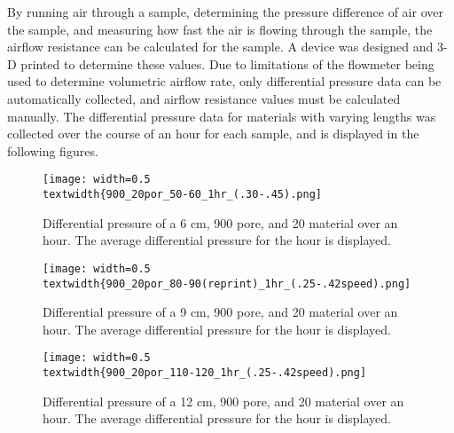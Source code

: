	By running air through a sample, determining the pressure difference of air over the 
sample, and measuring how fast the air is flowing through the sample, the airflow resistance 
can be calculated for the sample. A device was designed and 3-D printed to determine these 
values. Due to limitations of the flowmeter being used to determine volumetric airflow rate, 
only differential pressure data can be automatically collected, and airflow resistance values 
must be calculated manually. The differential pressure data for materials with varying 
lengths was collected over the course of an hour for each sample, and is displayed in the 
following figures.
\begin{figure}[h!]
  \begin{center}
    \texttt{[image: width=0.5\\textwidth\{900\_20por\_50-60\_1hr\_(.30-.45).png]}
  \end{center}
  \caption{Differential pressure of a 6 cm, 900 pore, and 20%
material over an hour. The average differential pressure for the hour is displayed.}
  \label{fig:6cm_dp_graph}
\end{figure}

\begin{figure}[h!]
  \begin{center}
    \texttt{[image: width=0.5\\textwidth\{900\_20por\_80-90(reprint)\_1hr\_(.25-.42speed).png]}
  \end{center}
  \caption{Differential pressure of a 9 cm, 900 pore, and 20%
material over an hour. The average differential pressure for the hour is displayed.}
  \label{fig:9cm_dp_graph}
\end{figure}

\begin{figure}[h!]
  \begin{center}
    \texttt{[image: width=0.5\\textwidth\{900\_20por\_110-120\_1hr\_(.25-.42speed).png]}
  \end{center}
  \caption{Differential pressure of a 12 cm, 900 pore, and 20%
material over an hour. The average differential pressure for the hour is displayed.}
  \label{fig:12cm_dp_graph}
\end{figure}
 
